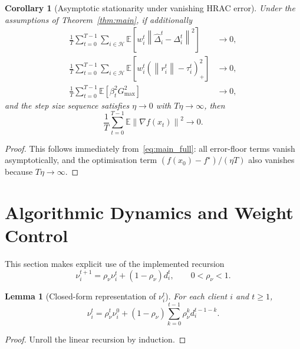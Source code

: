 \documentclass[11pt,a4paper]{article}
\newtheorem{lemma}{Lemma}
\newtheorem{corollary}{Corollary}
\theoremstyle{remark}
\newcommand{\E}{\mathbb{E}}
\newcommand{\HH}{\mathcal{H}}
\newcommand{\norm}[1]{\left\lVert #1 \right\rVert}
\begin{document}
\begin{corollary}[Asymptotic stationarity under vanishing HRAC error]
\label{cor:vanishing}
Under the assumptions of Theorem~\ref{thm:main}, if additionally
\begin{align}
    \frac{1}{T}\sum_{t=0}^{T-1}\sum_{i\in\HH}
    \E\!\left[w_i^t \norm{\hat{\Delta}_i^t-\Delta_i^t}^2\right]
    &\to 0,
    \label{eq:v1}\\
    \frac{1}{T}\sum_{t=0}^{T-1}\sum_{i\in\HH}
    \E\!\left[w_i^t(\norm{r_i^t}-\tau_i^t)_+^2\right]
    &\to 0,
    \label{eq:v2}\\
    \frac{1}{T}\sum_{t=0}^{T-1}
    \E\!\left[\beta_t^2 G_{\max}^2\right]
    &\to 0,
    \label{eq:v3}
\end{align}
and the step size sequence satisfies \(\eta \to 0\) with \(T\eta \to \infty\),
then
\begin{equation}
    \frac{1}{T}\sum_{t=0}^{T-1}\E\norm{\nabla f(x_t)}^2 \to 0.
    \label{eq:stationarity}
\end{equation}
\end{corollary}

\begin{proof}
This follows immediately from~\eqref{eq:main_full}: all error-floor terms
vanish asymptotically, and the optimisation term
\((f(x_0)-f^\star)/(\eta T)\) also vanishes because \(T\eta \to \infty\).
\end{proof}

\section{Algorithmic Dynamics and Weight Control}

This section makes explicit use of the implemented recursion
\[
    \nu_i^{t+1} = \rho_\nu \nu_i^t + (1-\rho_\nu)d_i^t,
    \qquad 0<\rho_\nu<1.
\]

\begin{lemma}[Closed-form representation of \(\nu_i^t\)]
\label{lem:nu_closed_form}
For each client \(i\) and \(t\ge 1\),
\begin{equation}
    \nu_i^t
    =
    \rho_\nu^t \nu_i^0
    +
    (1-\rho_\nu)\sum_{k=0}^{t-1}\rho_\nu^k d_i^{t-1-k}.
    \label{eq:nu_closed_form}
\end{equation}
\end{lemma}

\begin{proof}
Unroll the linear recursion by induction.
\end{proof}
\end{document}
